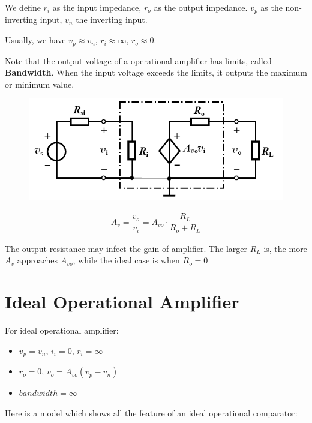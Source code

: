 We define $r_i$ as the input impedance, $r_o$ as the output impedance. $v_p$ as the non-inverting input, $v_n$  the inverting input.

Usually, we have $v_p \approx v_n$, $r_i \approx \infty$, $r_o \approx 0$.

Note that the output voltage of a operational amplifier has limits, called \textbf{Bandwidth}. When the input voltage exceeds the limits, it outputs the maximum or minimum value.

\begin{figure}[H]
  \centering
  \includegraphics[width=0.45\linewidth]{figures/op-amp-model}
\end{figure}

\begin{equation*}
  \begin{aligned}
    A_v = \dfrac{v_o}{v_i} = A_{vo} \cdot \dfrac{R_L}{R_o + R_L}  
  \end{aligned}
\end{equation*}

The output resistance may infect the gain of amplifier. The larger $R_L$ is, the more $A_v$ approaches $A_{vo}$, while the ideal case is when $R_o = 0$

\section{Ideal Operational Amplifier}

For ideal operational amplifier:

\begin{itemize}
\item $v_p = v_n$, $i_i = 0$, $r_i = \infty$
\item $r_o = 0$, $v_o = A_{vo} \left( v_p - v_n \right)$
\item $bandwidth = \infty$
  
\end{itemize}

Here is a model which shows all the feature of an ideal operational comparator:

